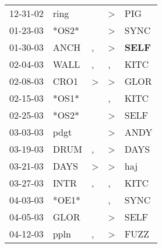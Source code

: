 \begin{supertabular}{p{0.07\textwidth}p{0.06\textwidth}p{0.02\textwidth}p{0.02\textwidth}p{0.06\textwidth}}
          12-31-02\textsuperscript{} &           ring\textsuperscript{} &                  &     \textgreater &            PIG\textsuperscript{} \\
          01-23-03\textsuperscript{} &                            *OS2* &                  &     \textgreater &           SYNC\textsuperscript{} \\
          01-30-03\textsuperscript{} &           ANCH\textsuperscript{} &                , &     \textgreater &  \textbf{SELF\textsuperscript{}} \\
          02-04-03\textsuperscript{} &           WALL\textsuperscript{} &                , &                , &           KITC\textsuperscript{} \\
          02-08-03\textsuperscript{} &           CRO1\textsuperscript{} &     \textgreater &     \textgreater &           GLOR\textsuperscript{} \\
          02-15-03\textsuperscript{} &                            *OS1* &                  &                , &           KITC\textsuperscript{} \\
          02-25-03\textsuperscript{} &                            *OS2* &                  &     \textgreater &           SELF\textsuperscript{} \\
          03-03-03\textsuperscript{} &           pdgt\textsuperscript{} &                  &     \textgreater &           ANDY\textsuperscript{} \\
          03-19-03\textsuperscript{} &           DRUM\textsuperscript{} &                , &     \textgreater &           DAYS\textsuperscript{} \\
          03-21-03\textsuperscript{} &           DAYS\textsuperscript{} &     \textgreater &     \textgreater &            haj\textsuperscript{} \\
          03-27-03\textsuperscript{} &           INTR\textsuperscript{} &                , &                , &           KITC\textsuperscript{} \\
          04-03-03\textsuperscript{} &                            *OE1* &                  &                , &           SYNC\textsuperscript{} \\
          04-05-03\textsuperscript{} &           GLOR\textsuperscript{} &                  &     \textgreater &           SELF\textsuperscript{} \\
          04-12-03\textsuperscript{} &           ppln\textsuperscript{} &                , &     \textgreater &           FUZZ\textsuperscript{} \\

\end{supertabular}
